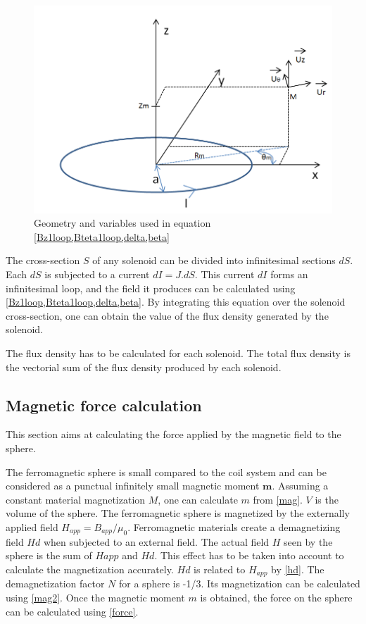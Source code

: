 \documentclass[letterpaper, 10 pt, conference]{ieeeconf}  %
\begin{document}
\begin{figure}
  \includegraphics[width=\linewidth]{single_loop.png}
  \caption{Geometry and variables used in equation \cref{Bz1loop,Bteta1loop,delta,beta}}
  \label{single_loop_geometry}
\end{figure}

The cross-section $S$ of any solenoid can be divided into infinitesimal sections $dS$. Each $dS$ is subjected to a current $dI=J.dS$. This current $dI$ forms an infinitesimal loop, and the field it produces can be calculated using \cref{Bz1loop,Bteta1loop,delta,beta}. By integrating this equation over the solenoid cross-section, one can obtain the value of the flux density generated by the solenoid.\par
The flux density has to be calculated for each solenoid. The total flux density is the vectorial sum of the flux density produced by each solenoid.

\subsection{Magnetic force calculation}

This section aims at calculating the force applied by the magnetic field to the sphere.\par
The ferromagnetic sphere is small compared to the coil system and can be considered as a punctual infinitely small magnetic moment $\mathbf{m}$. Assuming a constant material magnetization $M$, one can calculate $m$ from \ref{mag}. $V$ is the volume of the sphere.
The ferromagnetic sphere is magnetized by the externally applied field $H_{app}=B_{app}/\mu_0$. Ferromagnetic materials create a demagnetizing field $Hd$ when subjected to an external field. The actual field $H$ seen by the sphere is the sum of $Happ$ and $Hd$. This effect has to be taken into account to calculate the magnetization accurately. $Hd$ is related to $H_{app}$ by \ref{hd}. The demagnetization factor $N$ for a sphere is -1/3. Its magnetization can be calculated using \ref{mag2}.
Once the magnetic moment $m$ is obtained, the force on the sphere can be calculated using \ref{force}.
\end{document}
